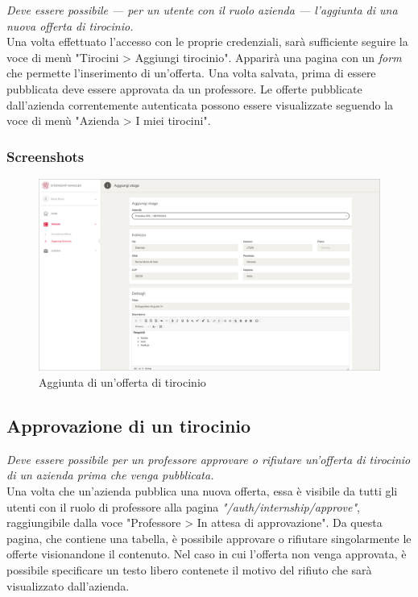 \textit{Deve essere possibile --- per un utente con il ruolo azienda --- l'aggiunta di una nuova offerta di tirocinio.} \\

\noindent
Una volta effettuato l'accesso con le proprie credenziali, sarà sufficiente seguire la voce di menù "Tirocini > Aggiungi tirocinio". Apparirà una pagina con un \textit{form} che permette l'inserimento di un'offerta. Una volta salvata, prima di essere pubblicata deve essere approvata da un professore. Le offerte pubblicate dall'azienda correntemente autenticata possono essere visualizzate seguendo la voce di menù "Azienda > I miei tirocini".

\subsubsection{Screenshots}
\begin{figure}[H]
	\centering
		\includegraphics[width=1\textwidth]{Figs/screenshots/addinternship}     
	\caption[Screenshot: aggiunta di un'offerta di tirocinio]{Aggiunta di un'offerta di tirocinio}
	\label{fig:screenshot:2}
\end{figure}

\pagebreak
\subsection{Approvazione di un tirocinio}

\textit{Deve essere possibile per un professore approvare o rifiutare un'offerta di tirocinio di un azienda prima che venga pubblicata.} \\

\noindent
Una volta che un'azienda pubblica una nuova offerta, essa è visibile da tutti gli utenti con il ruolo di professore alla pagina \textit{"/auth/internship/approve"}, raggiungibile dalla voce "Professore > In attesa di approvazione". Da questa pagina, che contiene una tabella, è possibile approvare o rifiutare singolarmente le offerte visionandone il contenuto. Nel caso in cui l'offerta non venga approvata, è possibile specificare un testo libero contenete il motivo del rifiuto che sarà visualizzato dall'azienda.

